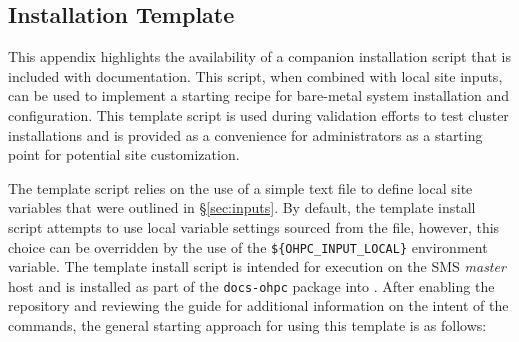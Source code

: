\subsection{Installation Template}  \label{appendix:template_script}

This appendix highlights the availability of a companion installation script
that is included with \OHPC{} documentation.  This script, when combined with
local site inputs, can be used to implement a starting recipe for
bare-metal system installation and configuration. This template script is used
during validation efforts to test cluster installations and is provided as a
convenience for administrators as a starting point for potential site
customization. 

The template script relies on the use of a simple text file to define local
site variables that were outlined in \S\ref{sec:inputs}.  By default, the
template install script attempts to use local variable settings sourced from
the  file, however, this
choice can be overridden by the use of the \texttt{\$\{OHPC\_INPUT\_LOCAL\}}
environment variable. The template install script is intended for execution on
the SMS {\em master} host and is installed as part of the \texttt{docs-ohpc}
package into .  After
enabling the \OHPC{} repository and reviewing the guide for additional
information on the intent of the commands, the general starting approach for
using this template is as follows:

